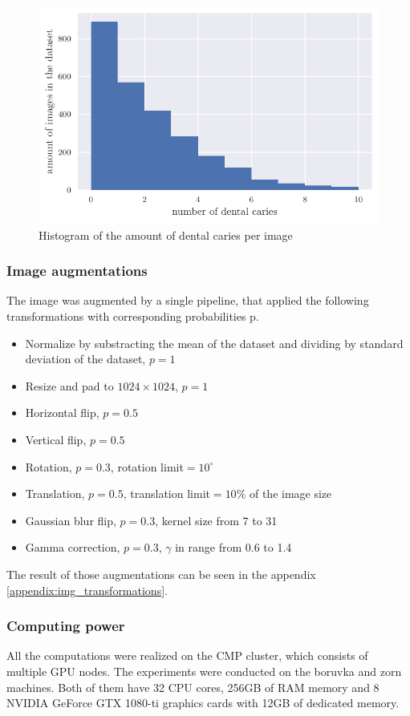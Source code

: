 \begin{figure}
    \includegraphics[width=\linewidth]{images/caries_histogram.pdf}
    \caption{Histogram of the amount of dental caries per image}
    \label{fig:hist_caries_per_img}
\end{figure}
\subsubsection{Image augmentations}
The image was augmented by a single pipeline, that applied the following transformations with corresponding probabilities p.
\begin{itemize}
    \item Normalize by substracting the mean of the dataset and dividing by standard deviation of the dataset, $p=1$
    \item Resize and pad to $1024\times1024$, $p=1$
    \item Horizontal flip, $p=0.5$
    \item Vertical flip, $p=0.5$
    \item Rotation, $p=0.3$, rotation limit$=10^{\circ}$
    \item Translation, $p=0.5$, translation limit$=10\%$ of the image size
    \item Gaussian blur flip, $p=0.3$, kernel size from 7 to 31
    \item Gamma correction, $p=0.3$, $\gamma$ in range from 0.6 to 1.4
\end{itemize}

The result of those augmentations can be seen in the appendix \ref{appendix:img_transformations}.
\subsubsection{Computing power}
All the computations were realized on the CMP cluster, which consists of multiple GPU nodes. The experiments were conducted on the boruvka and zorn machines. Both of them have 32 CPU cores, 256GB of RAM memory and 8 NVIDIA GeForce GTX 1080-ti graphics cards with 12GB of dedicated memory.

